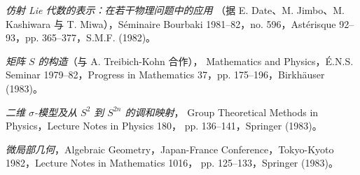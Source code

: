 \begin{description}
\item[{[33]}] \emph{仿射 Lie 代数的表示：在若干物理问题中的应用}
（据 E. Date、M. Jimbo、M. Kashiwara 与 T. Miwa），Séminaire Bourbaki
1981--82，no. 596，Astérisque 92--93，pp. 365--377，S.M.F. (1982)。

\item[{[34]}] \emph{矩阵 $S$ 的构造}（与 A. Treibich-Kohn 合作），
Mathematics and Physics，É.N.S. Seminar 1979--82，Progress in Mathematics
37，pp. 175--196，Birkhäuser (1983)。

\item[{[35]}] \emph{二维 $\sigma$-模型及从 $S^2$ 到 $S^{2n}$ 的调和映射}，
Group Theoretical Methods in Physics，Lecture Notes in Physics 180，
pp. 136--141，Springer (1983)。

\item[{[36]}] \emph{微局部几何}，Algebraic Geometry，Japan-France
Conference，Tokyo-Kyoto 1982，Lecture Notes in Mathematics 1016，
pp. 125--133，Springer (1983)。
\end{description}
\normalsize
